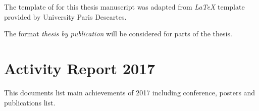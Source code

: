 \documentclass[12pt,]{book}
\theoremstyle{definition}
\theoremstyle{definition}
\theoremstyle{definition}
\theoremstyle{remark}
\begin{document}
The template of for this thesis manuscript was adapted from \emph{LaTeX}
template provided by University Paris Descartes.

The format \emph{thesis by publication} will be considered for parts of
the thesis.

\newpage

\hypertarget{activity-report-2017}{%
\section*{Activity Report 2017}\label{activity-report-2017}}

This documents list main achievements of 2017 including conference,
posters and publications list.




\end{document}
